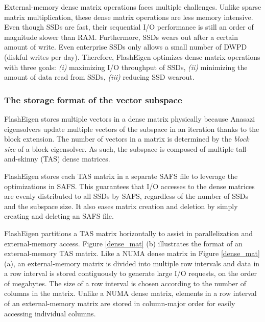 External-memory dense matrix operations faces multiple challenges.
Unlike sparse matrix multiplication, these dense matrix operations are less
memory intensive. Even though SSDs are fast, their sequential I/O performance
is still an order of magnitude slower than RAM. Furthermore, SSDs wears out
after a certain amount of write. Even enterprise SSDs \cite{ocz} only allows
a small number of DWPD
(diskful writes per day). Therefore, FlashEigen optimizes dense matrix operations
with three goals: \textit{(i)} maximizing I/O throughput of SSDs, \textit{(ii)}
minimizing the amount of data read from SSDs, \textit{(iii)} reducing SSD
wearout.

%		

\subsubsection{The storage format of the vector subspace}
FlashEigen stores multiple vectors in a dense matrix physically because Anasazi
eigensolvers update multiple vectors of the subspace in an iteration thanks to
the block extension. The number of vectors in a matrix is determined by
the \textit{block size} of a block eigensolver. %
As such, the subspace is composed of multiple tall-and-skinny (TAS) dense
matrices.

FlashEigen stores each TAS matrix in a separate SAFS file to leverage
the optimizations in SAFS. This guarantees that I/O accesses to the dense
matrices are evenly distributed to all SSDs by SAFS, regardless of the number
of SSDs and the subspace size. It also eases matrix creation and deletion by
simply creating and deleting an SAFS file.

FlashEigen partitions a TAS matrix horizontally to assist in parallelization
and external-memory access. Figure \ref{dense_mat} (b) illustrates the format
of an external-memory TAS matrix. Like
a NUMA dense matrix in Figure \ref{dense_mat} (a), an external-memory matrix
is divided into multiple row intervals and data in a row interval is stored
contiguously to generate large I/O requests, on the order of megabytes.
The size of a row interval is chosen according to the number of columns in the matrix.
Unlike a NUMA dense matrix, elements in a row interval of an external-memory
matrix are stored in column-major order for easily accessing individual columns.

